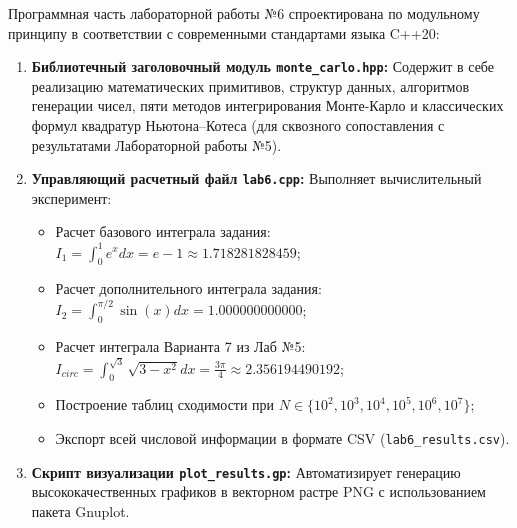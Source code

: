 \documentclass[11pt,a4paper]{article}
\begin{document}
Программная часть лабораторной работы №6 спроектирована по модульному принципу в соответствии с современными стандартами языка C++20:
\begin{enumerate}
    \item \textbf{Библиотечный заголовочный модуль \texttt{monte\_carlo.hpp}:}  
    Содержит в себе реализацию математических примитивов, структур данных, алгоритмов генерации чисел, пяти методов интегрирования Монте-Карло и классических формул квадратур Ньютона--Котеса (для сквозного сопоставления с результатами Лабораторной работы №5).
    
    \item \textbf{Управляющий расчетный файл \texttt{lab6.cpp}:}  
    Выполняет вычислительный эксперимент:
    \begin{itemize}
        \item Расчет базового интеграла задания: $I_1 = \int_0^1 e^x dx = e - 1 \approx 1.718281828459$;
        \item Расчет дополнительного интеграла задания: $I_2 = \int_0^{\pi/2} \sin(x) dx = 1.000000000000$;
        \item Расчет интеграла Варианта 7 из Лаб №5: $I_{circ} = \int_0^{\sqrt{3}} \sqrt{3 - x^2} dx = \frac{3\pi}{4} \approx 2.356194490192$;
        \item Построение таблиц сходимости при $N \in \{10^2, 10^3, 10^4, 10^5, 10^6, 10^7\}$;
        \item Экспорт всей числовой информации в формате CSV (\texttt{lab6\_results.csv}).
    \end{itemize}
    
    \item \textbf{Скрипт визуализации \texttt{plot\_results.gp}:}  
    Автоматизирует генерацию высококачественных графиков в векторном растре PNG с использованием пакета Gnuplot.
\end{enumerate}

\begin{figure}[h!]
\centering
{}
\end{figure}
\end{document}
